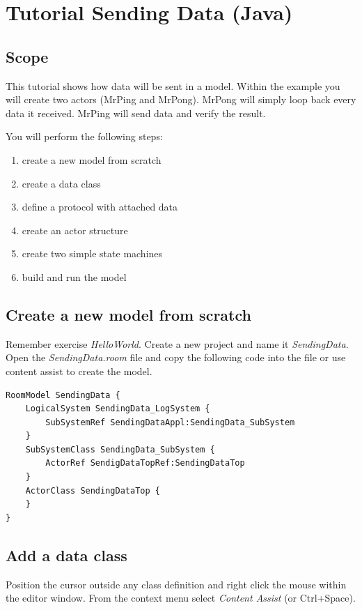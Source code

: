 \chapter{Tutorial Sending Data (Java)}

\section{Scope}

This tutorial shows how data will be sent in a \eTrice{} model. Within the example you will create two actors 
(MrPing and MrPong). MrPong will simply loop back every data it received.
MrPing will send data and verify the result.   

You will perform the following steps:

\begin{enumerate}
\item create a new model from scratch
\item create a data class
\item define a protocol with attached data
\item create an actor structure
\item create two simple state machines
\item build and run the model
\end{enumerate}

\section{Create a new model from scratch}

Remember exercise \textit{HelloWorld}.
Create a new \eTrice{} project and name it \textit{SendingData}.
Open the \textit{SendingData.room} file and copy the following code into the file or use content assist to 
create the model.


\begin{verbatim} 
RoomModel SendingData {
    LogicalSystem SendingData_LogSystem {
        SubSystemRef SendingDataAppl:SendingData_SubSystem 
    }
    SubSystemClass SendingData_SubSystem {
        ActorRef SendigDataTopRef:SendingDataTop 
    }
    ActorClass SendingDataTop {
    }
}
\end{verbatim}

\section{Add a data class}

Position the cursor outside any class definition and right click the mouse within the editor window. From 
the context menu select \textit{Content Assist} (or Ctrl+Space).  

